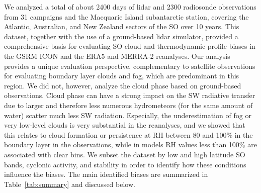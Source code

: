\documentclass[draft]{agujournal2019}
\begin{document}
We analyzed a total of about 2400 days of lidar and 2300 radiosonde observations from 31 campaigns and the Macquarie Island subantarctic station, covering the Atlantic, Australian, and New Zealand sectors of the SO over 10 years. This dataset, together with the use of a ground-based lidar simulator, provided a comprehensive basis for evaluating SO cloud and thermodynamic profile biases in the GSRM ICON and the ERA5 and MERRA-2 reanalyses. Our analysis provides a unique evaluation perspective, complementary to satellite observations for evaluating boundary layer clouds and fog, which are predominant in this region. We did not, however, analyze the cloud phase based on ground-based observations. Cloud phase can have a strong impact on the SW radiative transfer due to larger and therefore less numerous hydrometeors (for the same amount of water) scatter much less SW radiation. Especially, the underestimation of fog or very low-level clouds is very substantial in the reanalyses, and we showed that this relates to cloud formation or persistence at RH between 80 and 100\% in the boundary layer in the observations, while in models RH values less than 100\% are associated with clear bins. We subset the dataset by low and high latitude SO bands, cyclonic activity, and stability in order to identify how these conditions influence the biases. The main identified biases are summarized in Table~\ref{tab:summary} and discussed below.
\end{document}
